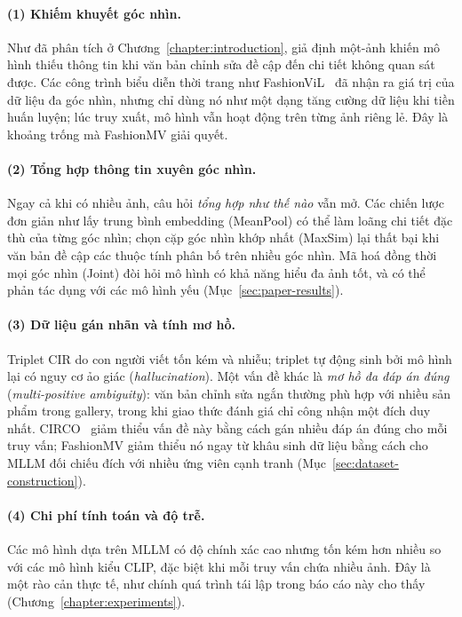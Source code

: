 \paragraph{(1) Khiếm khuyết góc nhìn.} Như đã phân tích ở Chương~\ref{chapter:introduction}, giả định một-ảnh khiến mô hình thiếu thông tin khi văn bản chỉnh sửa đề cập đến chi tiết không quan sát được. Các công trình biểu diễn thời trang như FashionViL~\cite{han2022fashionvil} đã nhận ra giá trị của dữ liệu đa góc nhìn, nhưng chỉ dùng nó như một dạng tăng cường dữ liệu khi tiền huấn luyện; lúc truy xuất, mô hình vẫn hoạt động trên từng ảnh riêng lẻ. Đây là khoảng trống mà FashionMV giải quyết.

\paragraph{(2) Tổng hợp thông tin xuyên góc nhìn.} Ngay cả khi có nhiều ảnh, câu hỏi \emph{tổng hợp như thế nào} vẫn mở. Các chiến lược đơn giản như lấy trung bình embedding (MeanPool) có thể làm loãng chi tiết đặc thù của từng góc nhìn; chọn cặp góc nhìn khớp nhất (MaxSim) lại thất bại khi văn bản đề cập các thuộc tính phân bố trên nhiều góc nhìn. Mã hoá đồng thời mọi góc nhìn (Joint) đòi hỏi mô hình có khả năng hiểu đa ảnh tốt, và có thể phản tác dụng với các mô hình yếu (Mục~\ref{sec:paper-results}).

\paragraph{(3) Dữ liệu gán nhãn và tính mơ hồ.} Triplet CIR do con người viết tốn kém và nhiễu; triplet tự động sinh bởi mô hình lại có nguy cơ ảo giác (\emph{hallucination}). Một vấn đề khác là \emph{mơ hồ đa đáp án đúng} (\emph{multi-positive ambiguity}): văn bản chỉnh sửa ngắn thường phù hợp với nhiều sản phẩm trong gallery, trong khi giao thức đánh giá chỉ công nhận một đích duy nhất. CIRCO~\cite{baldrati2023searle} giảm thiểu vấn đề này bằng cách gán nhiều đáp án đúng cho mỗi truy vấn; FashionMV giảm thiểu nó ngay từ khâu sinh dữ liệu bằng cách cho MLLM đối chiếu đích với nhiều ứng viên cạnh tranh (Mục~\ref{sec:dataset-construction}).

\paragraph{(4) Chi phí tính toán và độ trễ.} Các mô hình dựa trên MLLM có độ chính xác cao nhưng tốn kém hơn nhiều so với các mô hình kiểu CLIP, đặc biệt khi mỗi truy vấn chứa nhiều ảnh. Đây là một rào cản thực tế, như chính quá trình tái lập trong báo cáo này cho thấy (Chương~\ref{chapter:experiments}).

